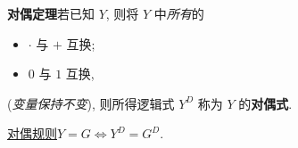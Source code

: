 \textbf{对偶定理}\quad 若已知 $Y$, 则将 $Y$ 中\textit{所有}的
\begin{itemize}
    \item $\cdot$ 与 $+$ 互换;
    \item $0$ 与 $1$ 互换,
\end{itemize}
(\textit{变量保持不变}), 则所得逻辑式 $Y^D$ 称为 $Y$ 的\textbf{对偶式}.

\underline{对偶规则}\quad $Y=G\Leftrightarrow Y^D=G^D$.